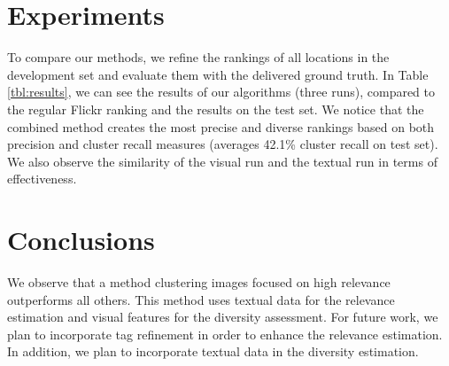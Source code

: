\documentclass{acm_proc_article-me11_tweaked}
\begin{document}
\section{Experiments}
To compare our methods, we refine the rankings of all locations in the development set and evaluate them with the delivered ground truth.
In Table \ref{tbl:results}, we can see the results of our algorithms (three runs), compared to the regular Flickr ranking and the results on the test set.
We notice that the combined method creates the most precise and diverse rankings based on both precision and cluster recall measures (averages 42.1\% cluster recall on test set). 
We also observe the similarity of the visual run and the textual run in terms of effectiveness.

\section{Conclusions}
We observe that a method clustering images focused on high relevance outperforms all others.
This method uses textual data for the relevance estimation and visual features for the diversity assessment.
For future work, we plan to incorporate tag refinement in order to enhance the relevance estimation. In addition, we plan to incorporate textual data in the diversity estimation.

%

\end{document}
